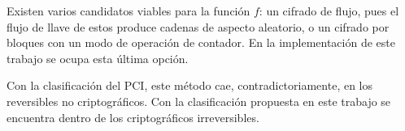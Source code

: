 Existen varios candidatos viables para la función $ f $: un cifrado de flujo,
pues el flujo de llave de estos produce cadenas de aspecto aleatorio, o un
cifrado por bloques con un modo de operación de contador. En la implementación
de este trabajo se ocupa esta última opción.

Con la clasificación del PCI, este método cae, contradictoriamente, en los
reversibles no criptográficos. Con la clasificación propuesta en este trabajo se
encuentra dentro de los criptográficos irreversibles.
